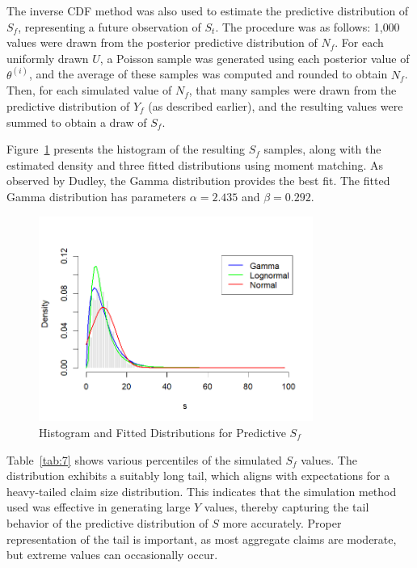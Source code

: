 \documentclass{Class/julia}
\begin{document}
The inverse CDF method was also used to estimate the predictive distribution of \( S_f \), representing a future observation of \( S_t \). The procedure was as follows: 1{,}000 values were drawn from the posterior predictive distribution of \( N_f \). For each uniformly drawn \( U \), a Poisson sample was generated using each posterior value of \( \theta^{(i)} \), and the average of these samples was computed and rounded to obtain \( N_f \). Then, for each simulated value of \( N_f \), that many samples were drawn from the predictive distribution of \( Y_f \) (as described earlier), and the resulting values were summed to obtain a draw of \( S_f \).

Figure~\ref{fig:10} presents the histogram of the resulting \( S_f \) samples, along with the estimated density and three fitted distributions using moment matching. As observed by Dudley, the Gamma distribution provides the best fit. The fitted Gamma distribution has parameters \( \alpha = 2.435 \) and \( \beta = 0.292 \).

\begin{figure}[!ht]
\centering
\includegraphics[width=0.8\textwidth]{rytgaard1990/predictive_S_f.png}
\caption{Histogram and Fitted Distributions for Predictive \( S_f \)}
\label{fig:10}
\end{figure}

Table~\ref{tab:7} shows various percentiles of the simulated \( S_f \) values. The distribution exhibits a suitably long tail, which aligns with expectations for a heavy-tailed claim size distribution. This indicates that the simulation method used was effective in generating large \( Y \) values, thereby capturing the tail behavior of the predictive distribution of \( S \) more accurately. Proper representation of the tail is important, as most aggregate claims are moderate, but extreme values can occasionally occur.
\end{document}
